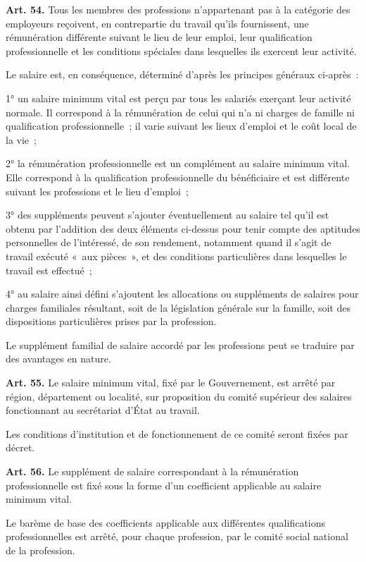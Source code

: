 \documentclass[french,twoside]{book} %
\newcommand{\labelchar}[1]{\textbf{\color{rubric} #1}}
\begin{document}
\noindent \labelchar{Art. 54.} Tous les membres des professions n’appartenant pas à la catégorie des employeurs reçoivent, en contrepartie du travail qu’ils fournissent, une rémunération différente suivant le lieu de leur emploi, leur qualification professionnelle et les conditions spéciales dans lesquelles ils exercent leur activité.\par
Le salaire est, en conséquence, déterminé d’après les principes généraux ci-après :\par
1° un salaire minimum vital est perçu par tous les salariés exerçant leur activité normale. Il correspond à la rémunération de celui qui n’a ni charges de famille ni qualification professionnelle ; il varie suivant les lieux d’emploi et le coût local de la vie ;\par
2° la rémunération professionnelle est un complément au salaire minimum vital. Elle correspond à la qualification professionnelle du bénéficiaire et est différente suivant les professions et le lieu d’emploi ;\par
3° des suppléments peuvent s’ajouter éventuellement au salaire tel qu’il est obtenu par l’addition des deux éléments ci-dessus pour tenir compte des aptitudes personnelles de l’intéressé, de son rendement, notamment quand il s’agit de travail exécuté « aux pièces », et des conditions particulières dans lesquelles le travail est effectué ;\par
4° au salaire ainsi défini s’ajoutent les allocations ou suppléments de salaires pour charges familiales résultant, soit de la législation générale sur la famille, soit des dispositions particulières prises par la profession.\par
Le supplément familial de salaire accordé par les professions peut se traduire par des avantages en nature.\par
\bigbreak
\noindent \labelchar{Art. 55.} Le salaire minimum vital, fixé par le Gouvernement, est arrêté par région, département ou localité, sur proposition du comité supérieur des salaires fonctionnant au secrétariat d’État au travail.\par
Les conditions d’institution et de fonctionnement de ce comité seront fixées par décret.\par
\bigbreak
\noindent \labelchar{Art. 56.} Le supplément de salaire correspondant à la rémunération professionnelle est fixé sous la forme d’un coefficient applicable au salaire minimum vital.\par
Le barème de base des coefficients applicable aux différentes qualifications professionnelles est arrêté, pour chaque profession, par le comité social national de la profession.\par
\end{document}
